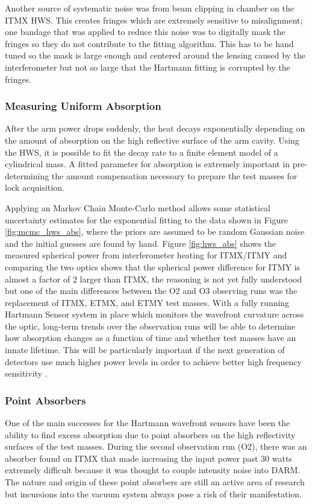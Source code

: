 	Another source of systematic noise was from beam clipping in chamber on the ITMX HWS. This creates fringes which are extremely sensitive to misalignment; one bandage that was applied to reduce this noise was to digitally mask the fringes so they do not contribute to the fitting algorithm.  This has to be hand tuned so the mask is large enough and centered around the lensing caused by the interferometer but not so large that the Hartmann fitting is corrupted by the fringes. 
	
	\subsubsection{Measuring Uniform Absorption}
	After the arm power drops suddenly, the heat decays exponentially depending on the amount of absorption on the high reflective surface of the arm cavity.  Using the HWS, it is possible to fit the decay rate to a finite element model of a cylindrical mass.  A fitted parameter for absorption is extremely important in pre-determining the amount compensation necessary to prepare the test masses for lock acquisition.  
	
	Applying an Markov Chain Monte-Carlo method allows some statistical uncertainty estimates for the exponential fitting to the data shown in Figure \ref{fig:mcmc_hws_abs}, where the priors are assumed to be random Gaussian noise and the initial guesses are found by hand. Figure \ref{fig:hws_abs} shows the measured spherical power from interferometer heating for ITMX/ITMY and comparing the two optics shows that the spherical power difference for ITMY is almost a factor of 2 larger than ITMX, the reasoning is not yet fully understood but one of the main differences between the O2 and O3 observing runs was the replacement of ITMX, ETMX, and ETMY test masses.  With a fully running Hartmann Sensor system in place which monitors the wavefront curvature across the optic, long-term trends over the observation runs will be able to determine how absorption changes as a function of time and whether test masses have an innate lifetime.  This will be particularly important if the next generation of detectors use much higher power levels in order to achieve better high frequency sensitivity \cite{DanBrown_prvt}.  
	
	\subsubsection{Point Absorbers}\label{sec:point_absorbers}
	One of the main successes for the Hartmann wavefront sensors have been the ability to find excess absorption due to point absorbers on the high reflectivity surfaces of the test masses.  During the second observation run (O2), there was an absorber found on ITMX that made increasing the input power past 30 watts extremely difficult because it was thought to couple intensity noise into DARM. The nature and origin of these point absorbers are still an active area of research but incursions into the vacuum system always pose a risk of their manifestation.
	
